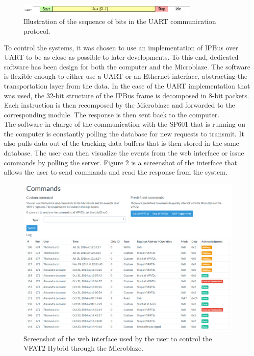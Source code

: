       \begin{figure}[b!]
        \centering
        \includegraphics[width=0.8\textwidth]{img/III-1-arch/uart.png}
        \caption{Illustration of the sequence of bits in the UART communication protocol.}
        \label{fig:III-1-uart}
      \end{figure}

      To control the systems, it was chosen to use an implementation of IPBus over UART to be as close as possible to later developments. To this end, dedicated software has been design for both the computer and the Microblaze. The software is flexible enough to either use a UART or an Ethernet interface, abstracting the transportation layer from the data. In the case of the UART implementation that was used, the 32-bit structure of the IPBus frame is decomposed in 8-bit packets. Each instruction is then recomposed by the Microblaze and forwarded to the corresponding module. The response is then sent back to the computer. \\

      The software in charge of the communication with the SP601 that is running on the computer is constantly polling the database for new requests to transmit. It also pulls data out of the tracking data buffers that is then stored in the same database. The user can then visualize the events from the web interface or issue commands by polling the server. Figure \ref{fig:III-1-app-cmd} is a screenshot of the interface that allows the user to send commands and read the response from the system.

      \begin{figure}[t!]
        \centering
        \includegraphics[width=\textwidth]{img/III-1-arch/app-cmd.png}
        \caption{Screenshot of the web interface used by the user to control the VFAT2 Hybrid through the Microblaze.}
        \label{fig:III-1-app-cmd}
      \end{figure}

